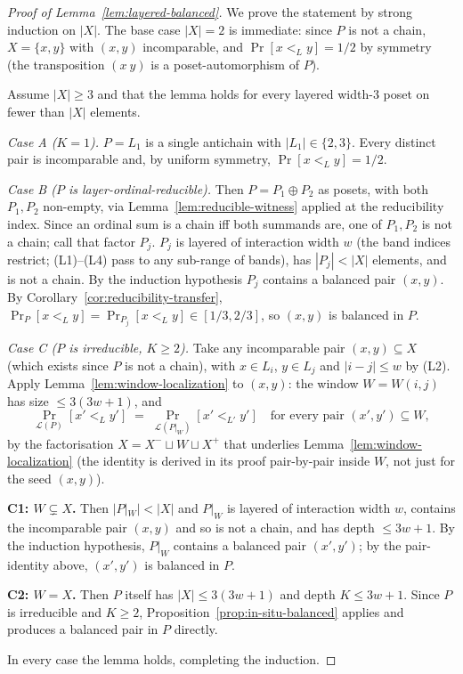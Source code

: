 \begin{proof}[Proof of Lemma~\ref{lem:layered-balanced}]
We prove the statement by strong induction on $|X|$. The base case
$|X| = 2$ is immediate: since $P$ is not a chain, $X = \{x, y\}$ with
$(x, y)$ incomparable, and $\Pr[x <_L y] = 1/2$ by symmetry (the
transposition $(x\ y)$ is a poset-automorphism of $P$).

Assume $|X| \ge 3$ and that the lemma holds for every layered
width-$3$ poset on fewer than $|X|$ elements.

\smallskip\noindent\emph{Case A ($K = 1$).} $P = L_1$ is a single
antichain with $|L_1| \in \{2, 3\}$. Every distinct pair is
incomparable and, by uniform symmetry, $\Pr[x <_L y] = 1/2$.

\smallskip\noindent\emph{Case B ($P$ is layer-ordinal-reducible).}
Then $P = P_1 \oplus P_2$ as posets, with both $P_1, P_2$ non-empty,
via Lemma~\ref{lem:reducible-witness} applied at the reducibility
index. Since an ordinal sum is a chain iff both summands are, one of
$P_1, P_2$ is not a chain; call that factor $P_j$. $P_j$ is layered
of interaction width $w$ (the band indices restrict; (L1)--(L4)
pass to any sub-range of bands), has $|P_j| < |X|$ elements, and is
not a chain. By the induction hypothesis $P_j$ contains a balanced
pair $(x, y)$. By Corollary~\ref{cor:reducibility-transfer},
$\Pr_P[x <_L y] = \Pr_{P_j}[x <_L y] \in [1/3, 2/3]$, so $(x, y)$ is
balanced in $P$.

\smallskip\noindent\emph{Case C ($P$ is irreducible, $K \ge 2$).}
Take any incomparable pair $(x, y) \subseteq X$ (which exists since
$P$ is not a chain), with $x \in L_i$, $y \in L_j$ and $|i - j| \le w$
by (L2). Apply Lemma~\ref{lem:window-localization} to $(x, y)$: the
window $W = W(i, j)$ has size $\le 3(3w+1)$, and
\[
  \Pr_{\mathcal L(P)}[x' <_L y']
  \;=\;
  \Pr_{\mathcal L(P|_W)}[x' <_{L'} y']
  \quad
  \text{for every pair }(x', y') \subseteq W,
\]
by the factorisation $X = X^- \sqcup W \sqcup X^+$ that underlies
Lemma~\ref{lem:window-localization} (the identity is derived in its
proof pair-by-pair inside $W$, not just for the seed $(x, y)$).

\textbf{C1: $W \subsetneq X$.} Then $\lvert P|_W \rvert < |X|$ and
$P|_W$ is layered of interaction width $w$, contains the incomparable
pair $(x, y)$ and so is not a chain, and has depth $\le 3w+1$. By the
induction hypothesis, $P|_W$ contains a balanced pair $(x', y')$; by
the pair-identity above, $(x', y')$ is balanced in $P$.

\textbf{C2: $W = X$.} Then $P$ itself has $|X| \le 3(3w+1)$ and depth
$K \le 3w + 1$. Since $P$ is irreducible and $K \ge 2$,
Proposition~\ref{prop:in-situ-balanced} applies and produces a
balanced pair in $P$ directly.

In every case the lemma holds, completing the induction.
\end{proof}

